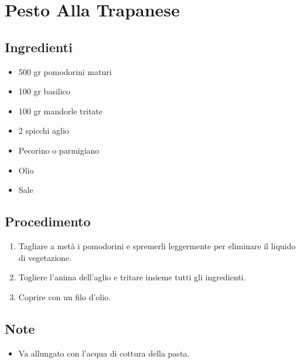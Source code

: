 \section{Pesto Alla Trapanese}
\subsection{Ingredienti}
\begin{itemize}
\item 500 gr pomodorini maturi  
\item 100 gr basilico  
\item 100 gr mandorle tritate  
\item 2 spicchi aglio  
\item Pecorino o parmigiano  
\item Olio  
\item Sale
\end{itemize}
\subsection{Procedimento}
\begin{enumerate}
\item  Tagliare a metà i pomodorini e spremerli leggermente per eliminare il liquido di vegetazione.  
\item  Togliere l'anima dell'aglio e tritare insieme tutti gli ingredienti.  
\item  Coprire con un filo d'olio.
\end{enumerate}
\subsection{Note}
\begin{itemize}
\item Va allungato con l'acqua di cottura della pasta.
\end{itemize}
